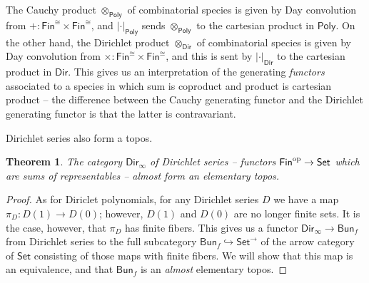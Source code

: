 \documentclass[11pt, article, one side]{memoir}
\theoremstyle{theorem}
\newtheorem{theorem}[section]{Theorem}
\theoremstyle{definition}
\theoremstyle{remark}
\newcommand{\Cat}[1]{\mathsf{#1}}%
\newcommand{\op}{^\tn{op}}
\newcommand{\tn}[1]{\textnormal{#1}}
\newcommand{\smset}{\Cat{Set}}
\newcommand{\finset}{\Cat{Fin}}
\newcommand{\bun}{\Cat{Bun}}
\newcommand{\poly}{\Cat{Poly}}
\newcommand{\dir}{\Cat{Dir}}
\begin{document}
The Cauchy product $\otimes_{\poly}$ of combinatorial species is given by Day
convolution from $+ : \finset^{\cong} \times \finset^{\cong}$, and
$|\cdot|_{\poly}$ sends $\otimes_{\poly}$ to the cartesian product in $\poly$. On the
other hand, the Dirichlet product $\otimes_{\dir}$ of combinatorial species is
given by Day convolution from $\times : \finset^{\cong} \times
\finset^{\cong}$, and this is sent by $|\cdot|_{\dir}$ to the cartesian
product in $\dir$. This gives us an interpretation of the generating \emph{functors}
associated to a species in which sum is coproduct and product is cartesian
product -- the difference between the Cauchy generating functor and the
Dirichlet generating functor is that the latter is contravariant.

Dirichlet series also form a topos.
\begin{theorem}
The category $\dir_{\infty}$ of \emph{Dirichlet series} -- functors $\finset\op \to \smset$ which are sums of representables -- \emph{almost} form an elementary topos.
\end{theorem}
\begin{proof}
As for Diriclet polynomials, for any Dirichlet series $D$ we have a map $\pi_D : D(1) \to D(0)$; however, $D(1)$ and $D(0)$ are no longer finite sets. It is the case, however, that $\pi_D$ has finite fibers. This gives us a functor $\dir_{\infty} \to \bun_f$ from Dirichlet series to the full subcategory $\bun_f \hookrightarrow \smset^{\to}$ of the arrow category of $\smset$ consisting of those maps with finite fibers. We will show that this map is an equivalence, and that $\bun_f$ is an \emph{almost} elementary topos.
\end{proof}
\fi


\printbibliography
\end{document}
